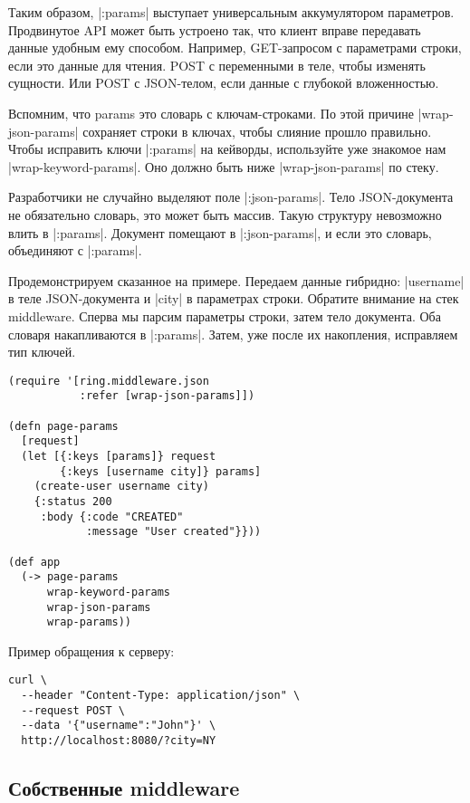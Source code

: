 Таким образом, \spverb|:params| выступает универсальным аккумулятором
параметров. Продвинутое API может быть устроено так, что клиент вправе
передавать данные удобным ему способом. Например, GET-запросом с параметрами
строки, если это данные для чтения. POST с переменными в теле, чтобы изменять
сущности. Или POST с JSON-телом, если данные с глубокой вложенностью.

Вспомним, что params это словарь с ключам-строками. По этой причине
\spverb|wrap-json-params| сохраняет строки в ключах, чтобы слияние прошло
правильно. Чтобы исправить ключи \spverb|:params| на кейворды, используйте уже знакомое
нам \spverb|wrap-keyword-params|. Оно должно быть ниже \spverb|wrap-json-params| по стеку.

Разработчики не случайно выделяют поле \spverb|:json-params|. Тело JSON-документа не
обязательно словарь, это может быть массив. Такую структуру невозможно влить в
\spverb|:params|. Документ помещают в \spverb|:json-params|, и если это словарь, объединяют с
\spverb|:params|.

Продемонстрируем сказанное на примере. Передаем данные гибридно: \spverb|username| в
теле JSON-документа и \spverb|city| в параметрах строки. Обратите внимание на стек
middleware. Сперва мы парсим параметры строки, затем тело документа. Оба словаря
накапливаются в \spverb|:params|. Затем, уже после их накопления, исправляем тип
ключей.

\begin{verbatim}
(require '[ring.middleware.json
           :refer [wrap-json-params]])

(defn page-params
  [request]
  (let [{:keys [params]} request
        {:keys [username city]} params]
    (create-user username city)
    {:status 200
     :body {:code "CREATED"
            :message "User created"}}))

(def app
  (-> page-params
      wrap-keyword-params
      wrap-json-params
      wrap-params))
\end{verbatim}

Пример обращения к серверу:

\begin{verbatim}
curl \
  --header "Content-Type: application/json" \
  --request POST \
  --data '{"username":"John"}' \
  http://localhost:8080/?city=NY
\end{verbatim}

\subsection{Собственные middleware}

